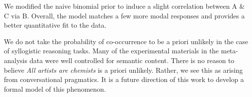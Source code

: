 \documentclass[10pt,letterpaper]{article}
\begin{document}
We modified the naive binomial prior to induce a slight correlation between A \& C via B. Overall, the model matches a few more modal responses and provides a better quantitative fit to the data. 

We do not take the probability of co-occurrence to be a priori unlikely in the case of syllogistic reasoning tasks. Many of the experimental materials in the meta-analysis data were well controlled for semantic content. There is no reason to believe \emph{All artists are chemists} is a priori unlikely. Rather, we see this as arising from conversational pragmatics. It is a future direction of this work to develop a formal model of this phenomenon.



%
%
%
\end{document}
